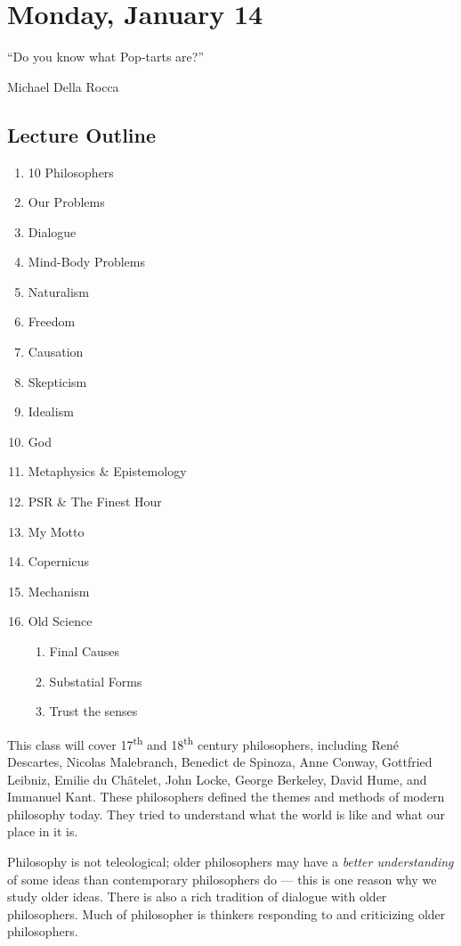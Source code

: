 
\section{Monday, January 14}

\epigraph{``Do you know what Pop-tarts are?''}{Michael Della Rocca}

\subsection*{Lecture Outline}
\begin{multicols}{2}
\begin{enumerate}
\item 10 Philosophers
\item Our Problems
\item Dialogue
\item Mind-Body Problems
\item Naturalism
\item Freedom
\item Causation
\item Skepticism
\item Idealism
\item God
\item Metaphysics \& Epistemology
\item PSR \& The Finest Hour
\item My Motto 
\item Copernicus
\item Mechanism
\item Old Science
\begin{enumerate}
\item Final Causes
\item Substatial Forms
\item Trust the senses
\end{enumerate}
\end{enumerate}
\end{multicols}

This class will cover 17\textsuperscript{th} and 18\textsuperscript{th} century philosophers, including René Descartes, Nicolas Malebranch, Benedict de Spinoza, Anne Conway, Gottfried Leibniz, Emilie du Châtelet, John Locke, George Berkeley, David Hume, and Immanuel Kant. These philosophers defined the themes and methods of modern philosophy today. They tried to understand what the world is like and what our place in it is.

Philosophy is not teleological; older philosophers may have a \emph{better understanding} of some ideas than contemporary philosophers do --- this is one reason why we study older ideas. There is also a rich tradition of dialogue with older philosophers. Much of philosopher is thinkers responding to and criticizing older philosophers.

